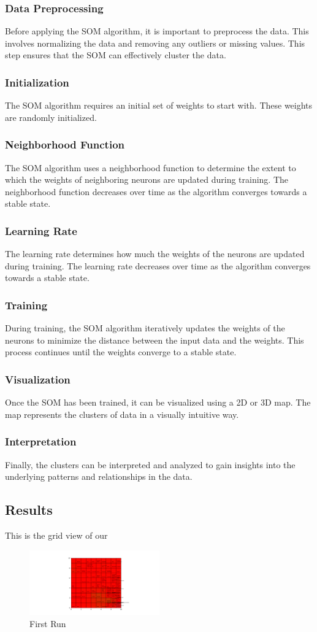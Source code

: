 \documentclass{article}
\begin{document}
\subsubsection{Data Preprocessing} 
Before applying the SOM algorithm, it is important to preprocess the data. This involves normalizing the data and removing any outliers or missing values. This step ensures that the SOM can effectively cluster the data.

\subsubsection{Initialization}
The SOM algorithm requires an initial set of weights to start with. These weights are randomly initialized.

\subsubsection{Neighborhood Function}
The SOM algorithm uses a neighborhood function to determine the extent to which the weights of neighboring neurons are updated during training. The neighborhood function decreases over time as the algorithm converges towards a stable state.

\subsubsection{Learning Rate}
The learning rate determines how much the weights of the neurons are updated during training. The learning rate decreases over time as the algorithm converges towards a stable state.

\subsubsection{Training}
During training, the SOM algorithm iteratively updates the weights of the neurons to minimize the distance between the input data and the weights. This process continues until the weights converge to a stable state.

\subsubsection{Visualization}
Once the SOM has been trained, it can be visualized using a 2D or 3D map. The map represents the clusters of data in a visually intuitive way.

\subsubsection{Interpretation}
Finally, the clusters can be interpreted and analyzed to gain insights into the underlying patterns and relationships in the data.

\subsection{Results}
This is the grid view of our 
\begin{figure}[H]
  \centering
  \includegraphics[width=0.5\textwidth, height=0.3\textheight]{grid.png}
  \caption{First Run}
\end{figure}
\end{document}
